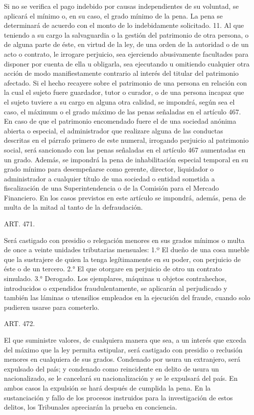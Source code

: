     Si no se verifica el pago indebido por causas independientes de su voluntad, se aplicará el mínimo o, en su caso, el grado mínimo de la pena.
    La pena se determinará de acuerdo con el monto de lo indebidamente solicitado.
    11. Al que teniendo a su cargo la salvaguardia o la gestión del patrimonio de otra persona, o de alguna parte de éste, en virtud de la ley, de una orden de la autoridad o de un acto o contrato, le irrogare perjuicio, sea ejerciendo abusivamente facultades para disponer por cuenta de ella u obligarla, sea ejecutando u omitiendo cualquier otra acción de modo manifiestamente contrario al interés del titular del patrimonio afectado.
    Si el hecho recayere sobre el patrimonio de una persona en relación con la cual el sujeto fuere guardador, tutor o curador, o de una persona incapaz que el sujeto tuviere a su cargo en alguna otra calidad, se impondrá, según sea el caso, el máximum o el grado máximo de las penas señaladas en el artículo 467.
    En caso de que el patrimonio encomendado fuere el de una sociedad anónima abierta o especial, el administrador que realizare alguna de las conductas descritas en el párrafo primero de este numeral, irrogando perjuicio al patrimonio social, será sancionado con las penas señaladas en el artículo 467 aumentadas en un grado. Además, se impondrá la pena de inhabilitación especial temporal en su grado mínimo para desempeñarse como gerente, director, liquidador o administrador a cualquier título de una sociedad o entidad sometida a fiscalización de una Superintendencia o de la Comisión para el Mercado Financiero.
    En los casos previstos en este artículo se impondrá, además, pena de multa de la mitad al tanto de la defraudación.





    ART. 471.

    Será castigado con presidio o relegación menores en sus grados mínimos o multa de once a veinte unidades tributarias mensuales:
    1.º El dueño de una cosa mueble que la sustrajere de quien la tenga legítimamente en su poder, con perjuicio de éste o de un tercero.
    2.° El que otorgare en perjuicio de otro un contrato simulado.
    3.° Derogado.
    Los ejemplares, máquinas u objetos contrahechos, introducidos o expendidos fraudulentamente, se aplicarán al perjudicado y también las láminas o utensilios empleados en la ejecución del fraude, cuando solo pudieren usarse para cometerlo.

    ART. 472.

    El que suministre valores, de cualquiera manera que sea, a un interés que exceda del máximo que la ley permita estipular, será castigado con presidio o reclusión menores en cualquiera de sus grados.
    Condenado por usura un extranjero, será expulsado del país; y condenado como reincidente en delito de usura un nacionalizado, se le cancelará su nacionalización y se le expulsará del país.
    En ambos casos la expulsión se hará después de cumplida la pena.
    En la sustanciación y fallo de los procesos instruidos para la investigación de estos delitos, los Tribunales apreciarán la prueba en conciencia.




